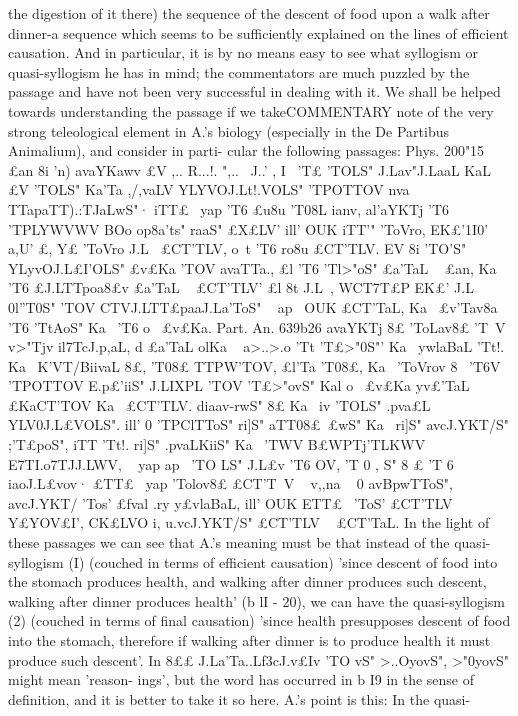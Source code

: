 {{{{{{{{{{{{{{{{{{{{{{{{{{{{{{{{{{{{{{{{{{{{{{{{{{{{{{{the digestion of it there) the sequence of the descent of food upon
a walk after dinner-a sequence which seems to be sufficiently
explained on the lines of efficient causation. And in particular,
it is by no means easy to see what syllogism or quasi-syllogism
he has in mind; the commentators are much puzzled by the
passage and have not been very successful in dealing with it. We
shall be helped towards understanding the passage if we takeCOMMENTARY
note of the very strong teleological element in A.'s biology
(especially in the De Partibus Animalium), and consider in parti-
cular the following passages: Phys. 200"15 £an 8i 'n) avaYKawv £V
,..
R...!.
",..
\ J..'
,
I
\
'T£ 'TOLS" J.Lav"J.LaaL KaL £V 'TOLS" Ka'Ta ,/,vaLV YLYVOJ.Lt!.VOLS" 'TPOTTOV nva
TTapaTT).:TJaLwS"· iTT£~ yap 'T6 £u8u 'T08L ianv, al'aYKTj 'T6 'TPLYWVWV BOo
op8a'ts" raaS" £X£LV' ill' OUK iTT'" 'ToVro, EK£'1I0' a,U' £, Y£ 'ToVro J.L~
£CT'TLV, o~t 'T6 ro8u £CT'TLV. EV 8i 'TO'S" YLyvOJ.L£I'OLS" £v£Ka 'TOV avaTTa.\Lv,
£l 'T6 'Tl>"oS" £a'TaL ~ £an, Ka~ 'T6 £J.LTTpoa8£v £a'TaL ~ £CT'TLV' £l
8t J.L~, WCT7T£P EK£' J.L~ 0l''T0S" 'TOV CTVJ.LTT£paaJ.La'ToS" ~ ap~ OUK £CT'TaL, Ka~
£v'Tav8a 'T6 'TtAoS" Ka~ 'T6 o~ £v£Ka. Part. An. 639b26 avaYKTj 8£
'ToLav8£ 'T~V v>"Tjv il7TcJ.p,aL, d £a'TaL olK{a ~ a>..>.o 'Tt 'T£>"0S"'
Ka~ ywlaBaL 'Tt!. Ka~ K'VT/BiivaL 8£, 'T08£ TTPW'TOV, £l'Ta 'T08£, Ka~ 'ToVrov
8~ 'T6V 'TPOTTOV E.p£'iiS" J.LIXPL 'TOV 'T£>"ovS" Kal o~ £v£Ka y{v£'TaL £KaCT'TOV
Ka~ £CT'TLV. diaav-rwS" 8£ Ka~ iv 'TOLS" .pva£L YLV0J.L£VOLS". ill' 0 'TPClTToS" ri]S"
aTT08£~£wS" Ka~ ri]S" avcJ.YKT/S" ;'T£poS", iTT{ 'Tt!. ri]S" .pvaLKiiS" Ka~ 'TWV
B£WPTj'TLKWV E7TI.o7TJJ.LWV, ~ yap ap~ 'TO LS" J.L£v 'T6 OV, 'T 0 , S" 8 £ 'T 6
iaoJ.L£vov· £TT£~ yap 'Tolov8£ £CT'T~V ~ v,,{na ~ 0 avBpwTToS", avcJ.YKT/
'Tos' £fval .ry y£vlaBaL, ill' OUK ETT£~ 'ToS' £CT'TLV ~ Y£YOV£I', CK£LVO i,
u.vcJ.YKT/S" £CT'TLV ~ £CT'TaL.
In the light of these passages we can see that A.'s meaning
must be that instead of the quasi-syllogism (I) (couched in terms
of efficient causation) 'since descent of food into the stomach
produces health, and walking after dinner produces such descent,
walking after dinner produces health' (b lI - 20), we can have the
quasi-syllogism (2) (couched in terms of final causation) 'since
health presupposes descent of food into the stomach, therefore
if walking after dinner is to produce health it must produce
such descent'.
In 8££ J.La'Ta.\aJ.Lf3cJ.v£Iv 'TO vS" >..OyovS", >"0yovS" might mean 'reason-
ings', but the word has occurred in b I9 in the sense of definition,
and it is better to take it so here. A.'s point is this: In the quasi-
}}}}}}}}}}}}}}}}}}}}}}}}}}}}}}}}}}}}}}}}}}}}}}}}}}}}}}}}}}}
